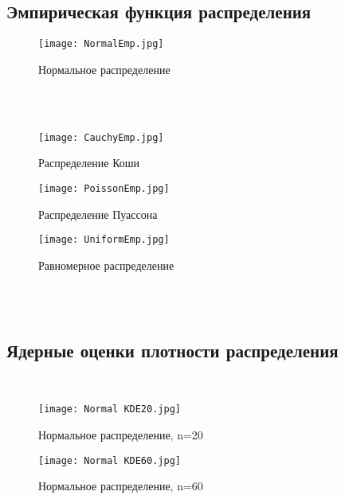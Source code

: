 \documentclass{article}
\begin{document}
\subsection{Эмпирическая функция распределения}

\begin{figure}[!ht]
\begin{center}
\texttt{[image: NormalEmp.jpg]}
\caption{Нормальное распределение}\label{figure1}
\end{center}
\end{figure}
~\\
~\\


\begin{figure}[!ht]
\begin{center}
\texttt{[image: CauchyEmp.jpg]}
\caption{Распределение Коши}\label{figure2}
\end{center}
\end{figure}

\begin{figure}[!ht]
\begin{center}
\texttt{[image: PoissonEmp.jpg]}
\caption{Распределение Пуассона}\label{figure4}
\end{center}
\end{figure}

\begin{figure}[!ht]
\begin{center}
\texttt{[image: UniformEmp.jpg]}
\caption{Равномерное распределение}\label{figure5}
\end{center}
\end{figure}

~\\
~\\


\subsection{Ядерные оценки плотности распределения}
~\\


\begin{figure}[!ht]
\begin{center}
\texttt{[image: Normal KDE20.jpg]}
\caption{Нормальное распределение, n=20}\label{figure5}
\end{center}
\end{figure}

\begin{figure}[!ht]
\begin{center}
\texttt{[image: Normal KDE60.jpg]}
\caption{Нормальное распределение, n=60}\label{figure5}
\end{center}
\end{figure}
\end{document}
